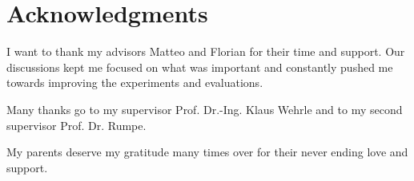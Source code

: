 \cleardoublepage

\chapter*{Acknowledgments}

I want to thank my advisors Matteo and Florian for their time and support.
Our discussions kept me focused on what was important and constantly pushed me towards improving the experiments and evaluations.

Many thanks go to my supervisor Prof. Dr.-Ing. Klaus Wehrle and to my second supervisor Prof. Dr. Rumpe.

My parents deserve my gratitude many times over for their never ending love and support.

